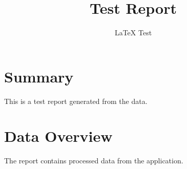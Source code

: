\documentclass{article}
\title{Test Report}
\author{LaTeX Test}
\begin{document}
\maketitle
\section{Summary}
This is a test report generated from the data.
\section{Data Overview}
The report contains processed data from the application.
\end{document}
